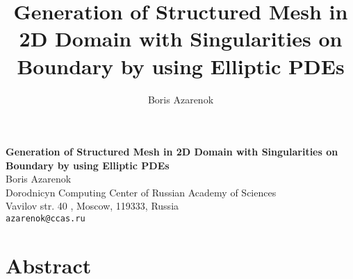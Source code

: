 \title{Generation of Structured Mesh in 2D Domain with Singularities on Boundary by using Elliptic PDEs}
\author{Boris Azarenok} 

\begin{center}

\textbf{\Large Generation of Structured Mesh in 2D Domain with Singularities on Boundary by using Elliptic PDEs}\\
\vspace{10mm}
{\large Boris Azarenok}\\
Dorodnicyn Computing Center of Russian Academy of Sciences \\ Vavilov str. 40 , Moscow, 119333, Russia \\
{\tt azarenok@ccas.ru}

\end{center}

\section*{Abstract}

